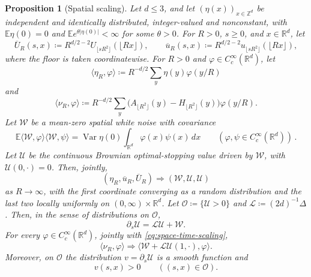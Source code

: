 \documentclass[11pt]{amsart}
\theoremstyle{plain}
\newtheorem{proposition}[theorem]{Proposition}
\theoremstyle{definition}
\newcommand{\Z}{\mathbb{Z}}
\newcommand{\E}{\mathbb{E}}
\DeclareMathOperator{\Var}{Var}
\begin{document}
\begin{proposition}[Spatial scaling]\label{prop:spatial-scaling}
	Let $d\leq3$, and let $(\eta(x))_{x\in\Z^d}$ be independent and identically
	distributed, integer-valued and nonconstant, with $\E\eta(0)=0$ and
	$\E e^{\theta|\eta(0)|}<\infty$ for some $\theta>0$. For $R>0$,
	$s\geq0$, and $x\in\mathbb R^d$, let
	\[
		\overline U_R(s,x)\coloneqq
		R^{d/2-2}U_{\lfloor sR^2\rfloor}(\lfloor Rx\rfloor),
		\qquad
		\overline u_R(s,x)\coloneqq
		R^{d/2-2}u_{\lfloor sR^2\rfloor}(\lfloor Rx\rfloor),
	\]
	where the floor is taken coordinatewise. For $R>0$ and
	$\varphi\in C_c^\infty(\mathbb R^d)$, let
	\[
		\langle\eta_R,\varphi\rangle
		\coloneqq R^{-d/2}\sum_y\eta(y)\varphi(y/R)
	\]
	and
	\[
		\langle\nu_R,\varphi\rangle
		\coloneqq R^{-d/2}\sum_y
		\bigl(A_{\lfloor R^2\rfloor}(y)-H_{\lfloor R^2\rfloor}(y)\bigr)
		\varphi(y/R).
	\]
	Let $\mathcal W$ be a mean-zero spatial white noise with covariance
	\[
		\E\langle\mathcal W,\varphi\rangle\langle\mathcal W,\psi\rangle
		=\Var\eta(0)\int_{\mathbb R^d}\varphi(x)\psi(x)\,dx
		\qquad(\varphi,\psi\in C_c^\infty(\mathbb R^d))\,.
	\]
	Let $\mathcal U$ be the continuous Brownian optimal-stopping value driven by
	$\mathcal W$, with $\mathcal U(0,\cdot)=0$. Then, jointly,
	\begin{equation}\label{eq:space-time-scaling}
		(\eta_R,\overline u_R,\overline U_R)
		\Longrightarrow(\mathcal W,\mathcal U,\mathcal U)
	\end{equation}
	as $R\to\infty$, with the first coordinate converging as a random
	distribution and the last two locally uniformly on
	$(0,\infty)\times\mathbb R^d$.
	Let
	$\mathcal O\coloneqq\{\mathcal U>0\}$ and
	$\mathcal L\coloneqq(2d)^{-1}\Delta$. Then, in
	the sense of distributions on $\mathcal O$,
	\begin{equation}\label{eq:continuum-equation}
		\partial_s\mathcal U=\mathcal L\mathcal U+\mathcal W.
	\end{equation}
	For every $\varphi\in C_c^\infty(\mathbb R^d)$, jointly with
	\eqref{eq:space-time-scaling},
	\begin{equation}\label{eq:signed-density-limit}
		\langle\nu_R,\varphi\rangle\Longrightarrow
		\langle\mathcal W+\mathcal L\mathcal U(1,\cdot),\varphi\rangle.
	\end{equation}
	Moreover, on $\mathcal O$ the distribution
	$v=\partial_s\mathcal U$ is a smooth function and
	\begin{equation}\label{eq:strict-time-derivative}
		v(s,x)>0\qquad ((s,x)\in\mathcal O).
	\end{equation}
\end{proposition}
\end{document}
